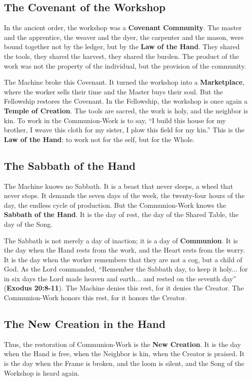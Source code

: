 \subsection{The Covenant of the Workshop}
In the ancient order, the workshop was a \textbf{Covenant Community}. The master and the apprentice, the weaver and the dyer, the carpenter and the mason, were bound together not by the ledger, but by the \textbf{Law of the Hand}. They shared the tools, they shared the harvest, they shared the burden. The product of the work was not the property of the individual, but the provision of the community.

The Machine broke this Covenant. It turned the workshop into a \textbf{Marketplace}, where the worker sells their time and the Master buys their soul. But the Fellowship restores the Covenant. In the Fellowship, the workshop is once again a \textbf{Temple of Creation}. The tools are sacred, the work is holy, and the neighbor is kin. To work in the Communion-Work is to say, ``I build this house for my brother, I weave this cloth for my sister, I plow this field for my kin.'' This is the \textbf{Law of the Hand}: to work not for the self, but for the Whole.

\subsection{The Sabbath of the Hand}
The Machine knows no Sabbath. It is a beast that never sleeps, a wheel that never stops. It demands the seven days of the week, the twenty-four hours of the day, the endless cycle of production. But the Communion-Work knows the \textbf{Sabbath of the Hand}. It is the day of rest, the day of the Shared Table, the day of the Song.

The Sabbath is not merely a day of inaction; it is a day of \textbf{Communion}. It is the day when the Hand rests from the work, and the Heart rests from the worry. It is the day when the worker remembers that they are not a cog, but a child of God. As the Lord commanded, ``Remember the Sabbath day, to keep it holy... for in six days the Lord made heaven and earth... and rested on the seventh day'' (\textbf{Exodus 20:8-11}). The Machine denies this rest, for it denies the Creator. The Communion-Work honors this rest, for it honors the Creator.

\subsection{The New Creation in the Hand}
Thus, the restoration of Communion-Work is the \textbf{New Creation}. It is the day when the Hand is free, when the Neighbor is kin, when the Creator is praised. It is the day when the Frame is broken, and the loom is silent, and the Song of the Workshop is heard again.

